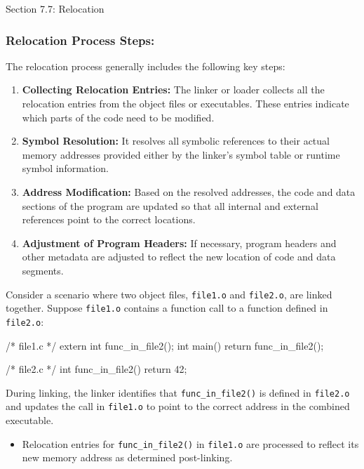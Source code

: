 \begin{notes}{Section 7.7: Relocation}
    \subsubsection*{Relocation Process Steps:}
    
    The relocation process generally includes the following key steps:
    \begin{enumerate}
        \item \textbf{Collecting Relocation Entries:} The linker or loader collects all the relocation entries from the object files or executables. These entries indicate which parts of the code need 
        to be modified.
        \item \textbf{Symbol Resolution:} It resolves all symbolic references to their actual memory addresses provided either by the linker's symbol table or runtime symbol information.
        \item \textbf{Address Modification:} Based on the resolved addresses, the code and data sections of the program are updated so that all internal and external references point to the correct locations.
        \item \textbf{Adjustment of Program Headers:} If necessary, program headers and other metadata are adjusted to reflect the new location of code and data segments.
    \end{enumerate}
    
    \begin{highlight}
        Consider a scenario where two object files, \texttt{file1.o} and \texttt{file2.o}, are linked together. Suppose \texttt{file1.o} contains a function call to a function defined in \texttt{file2.o}:
    
    \begin{code}[C]
    /* file1.c */
    extern int func_in_file2();
    int main() {
        return func_in_file2();
    }
    
    /* file2.c */
    int func_in_file2() {
        return 42;
    }
    \end{code}
        
        During linking, the linker identifies that \texttt{func\_in\_file2()} is defined in \texttt{file2.o} and updates the call in \texttt{file1.o} to point to the correct address in the combined executable.
        \begin{itemize}
            \item Relocation entries for \texttt{func\_in\_file2()} in \texttt{file1.o} are processed to reflect its new memory address as determined post-linking.
        \end{itemize}
    \end{highlight}
    

\end{notes}
